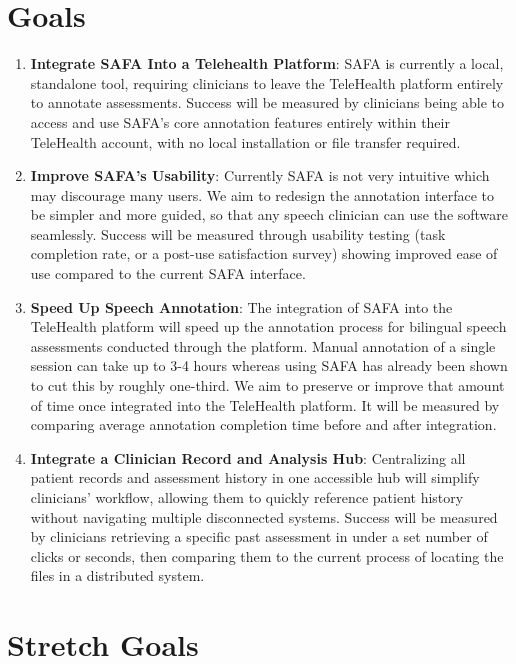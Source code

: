 \documentclass{article}
\begin{document}
\section{Goals}
\begin{enumerate}
    \item \textbf{Integrate SAFA Into a Telehealth Platform}: SAFA is currently a local, standalone tool, requiring clinicians to leave the TeleHealth platform entirely to annotate assessments. Success will be measured by clinicians being able to access and use SAFA's core annotation features entirely within their TeleHealth account, with no local installation or file transfer required.
    \item \textbf{Improve SAFA’s Usability}: Currently SAFA is not very intuitive which may discourage many users. We aim to redesign the annotation interface to be simpler and more guided, so that any speech clinician can use the software seamlessly. Success will be measured through usability testing (task completion rate, or a post-use satisfaction survey) showing improved ease of use compared to the current SAFA interface.
    \item \textbf{Speed Up Speech Annotation}: The integration of SAFA into the TeleHealth platform will speed up the annotation process for bilingual speech assessments conducted through the platform. Manual annotation of a single session can take up to 3-4 hours whereas using SAFA has already been shown to cut this by roughly one-third. We aim to preserve or improve that amount of time once integrated into the TeleHealth platform. It will be measured by comparing average annotation completion time before and after integration.
    \item \textbf{Integrate a Clinician Record and Analysis Hub}: Centralizing all patient records and assessment history in one accessible hub will simplify clinicians' workflow, allowing them to quickly reference patient history without navigating multiple disconnected systems. Success will be measured by clinicians retrieving a specific past assessment in under a set number of clicks or seconds, then comparing them to the current process of locating the files in a distributed system.
\end{enumerate}

\section{Stretch Goals}
\end{document}
